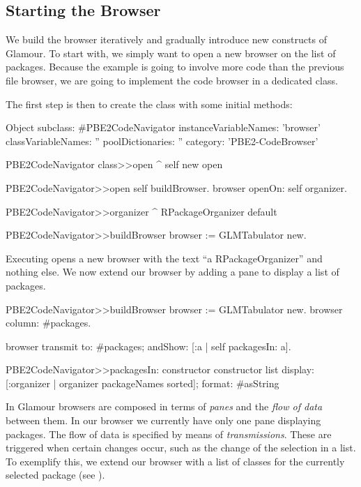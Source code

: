 \documentclass[a4paper,10pt,twoside]{book}
\begin{document}
\subsection{Starting the Browser}

We build the browser iteratively and gradually introduce new
constructs of Glamour. To start with, we simply want to open a new
browser on the list of packages. Because the example is going to
involve more code than the previous file browser, we are going to
implement the code browser in a dedicated class.

The first step is then to create the class with some initial methods:

\begin{code}{}
Object subclass: #PBE2CodeNavigator
  instanceVariableNames: 'browser'
  classVariableNames: ''
  poolDictionaries: ''
  category: 'PBE2-CodeBrowser'

PBE2CodeNavigator class>>open
  ^ self new open

PBE2CodeNavigator>>open
  self buildBrowser.
  browser openOn: self organizer.

PBE2CodeNavigator>>organizer
  ^ RPackageOrganizer default

PBE2CodeNavigator>>buildBrowser
  browser := GLMTabulator new.
\end{code}

Executing  opens a new browser with the text
``a RPackageOrganizer'' and nothing else. We now extend our browser by
adding a pane to display a list of packages.

\begin{code}{}
PBE2CodeNavigator>>buildBrowser
  browser := GLMTabulator new.
  browser
    column: #packages.

  browser transmit to: #packages; andShow: [:a | self packagesIn: a].

PBE2CodeNavigator>>packagesIn: constructor
  constructor list
    display: [:organizer | organizer packageNames sorted];
    format: #asString
\end{code}

In Glamour browsers are composed in terms of \emph{panes} and the
\emph{flow of data} between them. In our browser we currently have
only one pane displaying packages. The flow of data is specified by
means of \emph{transmissions}. These are triggered when certain
changes occur, such as the change of the selection in a list. To
exemplify this, we extend our browser with a list of classes for the
currently selected package (see ).
\end{document}
